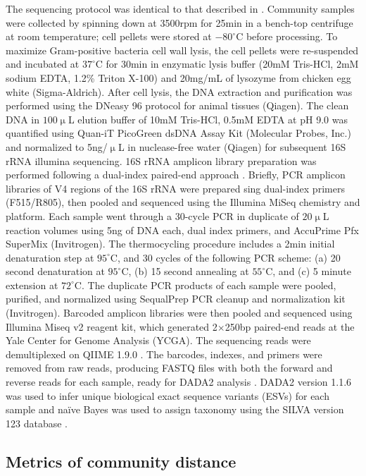 \documentclass[a4paper,10pt]{article}
\begin{document}
The sequencing protocol was identical to that described in \cite{Goldford2018}.
Community samples were collected by spinning down at 3500rpm for 25min
in a bench-top centrifuge at room temperature;
cell pellets were stored at $-80^\circ$C before processing.
To maximize Gram-positive bacteria cell wall lysis,
the cell pellets were re-suspended and incubated at $37^\circ$C for 30min
in enzymatic lysis buffer (20mM Tris-HCl, 2mM sodium EDTA, 1.2\% Triton X-100)
and 20mg/mL of lysozyme from chicken egg white (Sigma-Aldrich).
After cell lysis, the DNA extraction and purification was performed using the
DNeasy 96 protocol for animal tissues (Qiagen).
The clean DNA in $100\upmu$L elution buffer of 10mM Tris-HCl, 0.5mM EDTA
at pH 9.0 was quantified using Quan-iT PicoGreen dsDNA Assay Kit
(Molecular Probes, Inc.)
and normalized to 5ng/$\upmu$L in nuclease-free water (Qiagen)
for subsequent 16S rRNA illumina sequencing.
16S rRNA amplicon library preparation was performed following a dual-index
paired-end approach \cite{Kozich2013}.
Briefly, PCR amplicon libraries of V4 regions of the 16S rRNA were prepared 
sing dual-index primers (F515/R805), then pooled and sequenced
using the Illumina MiSeq chemistry and platform.
Each sample went through a 30-cycle PCR in duplicate of $20\upmu$L
reaction volumes using 5ng of DNA each, dual index primers, and AccuPrime Pfx SuperMix (Invitrogen).
The thermocycling procedure includes a 2min initial denaturation step at
$95^\circ$C, and 30 cycles of the following PCR scheme:
(a) 20 second denaturation at $95^\circ$C,
(b) 15 second annealing at $55^\circ$C,
and (c) 5 minute extension at $72^\circ$C.
The duplicate PCR products of each sample were pooled, purified, and normalized
using SequalPrep PCR cleanup and normalization kit (Invitrogen).
Barcoded amplicon libraries were then pooled and sequenced using
Illumina Miseq v2 reagent kit, which generated 2$\times$250bp paired-end reads
at the Yale Center for Genome Analysis (YCGA).
The sequencing reads were demultiplexed on QIIME 1.9.0 \cite{Caporaso2010}.
The barcodes, indexes, and primers were removed from raw reads,
producing FASTQ files with both the forward and reverse reads for each sample,
ready for DADA2 analysis \cite{Callahan2017}.
DADA2 version 1.1.6 was used to infer unique biological exact sequence variants
(ESVs) for each sample
and na{\"i}ve Bayes was used to assign taxonomy using the SILVA version 123
database \cite{Wang2007,Quast2013}.

\subsection*{Metrics of community distance}
\label{methods:metrics}
\end{document}
